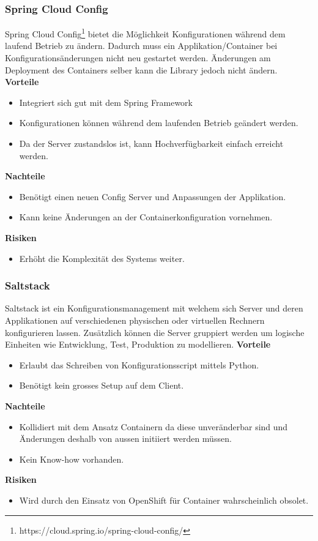 \subsubsection{Spring Cloud Config}
Spring Cloud Config\footnote{https://cloud.spring.io/spring-cloud-config/} bietet die Möglichkeit Konfigurationen während dem laufend Betrieb zu ändern. Dadurch muss ein Applikation/Container bei Konfigurationsänderungen nicht neu gestartet werden. Änderungen am Deployment des Containers selber kann die Library jedoch nicht ändern.\newline
\newpage
\textbf{Vorteile}
\begin{itemize}
	\item Integriert sich gut mit dem Spring Framework
	\item Konfigurationen können während dem laufenden Betrieb geändert werden.
	\item Da der Server zustandslos ist, kann Hochverfügbarkeit einfach erreicht werden.
\end{itemize}
\textbf{Nachteile}
\begin{itemize}
	\item Benötigt einen neuen Config Server und Anpassungen der Applikation.
	\item Kann keine Änderungen an der Containerkonfiguration vornehmen.
\end{itemize}
\textbf{Risiken}
\begin{itemize}
	\item Erhöht die Komplexität des Systems weiter.
\end{itemize}

\subsubsection{Saltstack}

Saltstack ist ein Konfigurationsmanagement mit welchem sich Server und deren Applikationen auf verschiedenen physischen oder virtuellen Rechnern konfigurieren lassen. Zusätzlich können die Server gruppiert werden um logische Einheiten wie Entwicklung, Test, Produktion zu modellieren.\newline
\newline
\textbf{Vorteile}
\begin{itemize}
	\item Erlaubt das Schreiben von Konfigurationsscript mittels Python.
	\item Benötigt kein grosses Setup auf dem Client.
\end{itemize}
\textbf{Nachteile}
\begin{itemize}
	\item Kollidiert mit dem Ansatz Containern da diese unveränderbar sind und Änderungen deshalb von aussen initiiert werden müssen.
	\item Kein Know-how vorhanden.
\end{itemize}
\textbf{Risiken}
\begin{itemize}
	\item Wird durch den Einsatz von OpenShift für Container wahrscheinlich obsolet.
\end{itemize}

